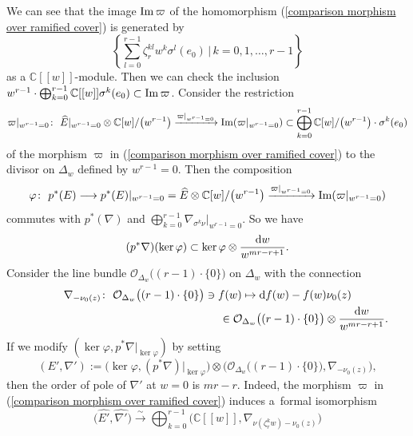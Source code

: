 \documentclass[pdftex]{sigma}
\numberwithin{equation}{section}
\newcommand\im{\mathop{\rm Im}\nolimits}
\begin{document}
We can see that the image
$\im\varpi$ of the homomorphism (\ref{comparison morphism over ramified cover})
is generated by
\[
 \left\{ \sum_{l=0}^{r-1} \zeta_r^{kl}w^k \sigma^l(e_0) \, \bigg| \, k=0,1,\dots,r-1 \right\}
\]
as a $\mathbb{C}[[w]]$-module.
Then we can check the inclusion
$w^{r-1}\cdot\bigoplus_{k=0}^{r-1}\mathbb{C}[[w]]\sigma^k(e_0)\subset\im\varpi$.
Consider the restriction
\begin{gather*}
 \varpi|_{w^{r-1}=0}
 \colon \
 \widehat{E}|_{w^{r-1}=0}\otimes\mathbb{C}[w]/\big(w^{r-1}\big)
 \xrightarrow {\varpi|_{w^{r-1}=0}}
 \im(\varpi|_{w^{r-1}=0})
 \subset \bigoplus_{k=0}^{r-1} \mathbb{C}[w]/\big(w^{r-1}\big) \cdot \sigma^k(e_0)
\end{gather*}
of the morphism $\varpi$ in (\ref{comparison morphism over ramified cover})
to the divisor on $\Delta_w$ defined by $w^{r-1}=0$.
Then the composition
\begin{equation*}
 \varphi \colon \
 p^*(E) \longrightarrow p^*(E)|_{w^{r-1}=0}
 =\widehat{E}\otimes\mathbb{C}[w]/\big(w^{r-1}\big)
 \xrightarrow{\varpi|_{w^{r-1}=0}} \im(\varpi|_{w^{r-1}=0})
\end{equation*}
commutes with $p^*(\nabla)$ and $\bigoplus_{k=0}^{r-1}\nabla_{\sigma^k\nu}|_{w^{r-1}=0}$.
So we have
\[
 (p^*\nabla)(\ker\varphi)\subset \ker\varphi\otimes \frac{{\rm d}w}{w^{mr-r+1}}.
\]
Consider the line bundle
${\mathcal O}_{\Delta_w}\big((r-1)\cdot\{0\}\big)$
on $\Delta_w$ with the connection
\begin{gather*}
 \nabla_{-\nu_0(z)}\colon \ {\mathcal O}_{\Delta_w}\big((r-1)\cdot\{0\}\big)
 \ni f(w) \mapsto {\rm d}f(w)-f(w) \nu_0(z) \\
 \hphantom{ \nabla_{-\nu_0(z)}\colon \ {\mathcal O}_{\Delta_w}\big((r-1)\cdot\{0\}\big)
 \ni f(w) \mapsto}{} \in
 {\mathcal O}_{\Delta_w}\big((r-1)\cdot\{0\}\big)\otimes\frac{{\rm d}w}{w^{mr-r+1}}.
\end{gather*}
If we modify $(\ker\varphi,p^*\nabla|_{\ker\varphi})$
by setting
\begin{equation} \label{equation: unramified connection by elementary transform}
 (E',\nabla')
 :=
 \big( \ker\varphi,(p^*\nabla)|_{\ker\varphi} \big)
 \otimes \big( {\mathcal O}_{\Delta_w}\big((r-1)\cdot\{0\}\big), \nabla_{-\nu_0(z)} \big),
\end{equation}
then the order of pole of $\nabla'$ at $w=0$ is $mr-r$.
Indeed, the morphism $\varpi$
in (\ref{comparison morphism over ramified cover})
induces a~formal isomorphism
\begin{equation*}
 \big(\widehat{E'},\widehat{\nabla'}\big)
 \stackrel{\sim}\longrightarrow
 \bigoplus_{k=0}^{r-1} \big(\mathbb{C}[[w]],\nabla_{\nu(\zeta_r^kw)-\nu_0(z)}\big)
\end{equation*}
\end{document}
